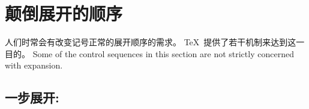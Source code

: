 \documentclass{book}
\begin{document}
\section{颠倒展开的顺序}

人们时常会有改变记号正常的展开顺序的需求。 \TeX\ 提供了若干机制来达到这一目的。 
Some of the control sequences in this section are
not strictly concerned with expansion.

\subsection{一步展开: \protect{}}
\end{document}

